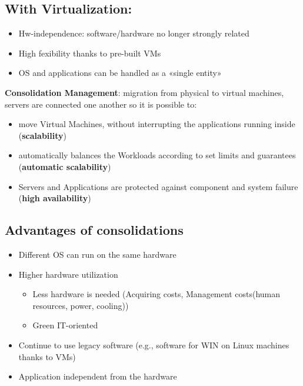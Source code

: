 \documentclass[10pt, oneside]{article}
\begin{document}
\subsection*{With Virtualization:}
\begin{itemize}
    \item Hw-independence: software/hardware no longer strongly related
    \item High fexibility thanks to pre-built VMs
    \item OS and applications can be handled as a «single entity»
\end{itemize}
{\bf Consolidation Management}: migration from physical to virtual machines, servers are connected one another so it is possible to:\begin{itemize}
    \item move Virtual Machines, without interrupting the applications running inside ({\bf scalability})
    \item automatically balances the Workloads according to set limits and guarantees ({\bf automatic scalability})
    \item Servers and Applications are protected against component and system failure ({\bf high availability})
\end{itemize}
\subsection*{Advantages of consolidations}
\begin{itemize}
    \item Different OS can run on the same hardware
    \item Higher hardware utilization\begin{itemize}
        \item Less hardware is needed (Acquiring costs, Management costs(human resources, power, cooling))
        \item Green IT-oriented
    \end{itemize} 
    \item Continue to use legacy software (e.g., software for WIN on Linux machines thanks to VMs)
    \item Application independent from the hardware
\end{itemize}
\end{document}
